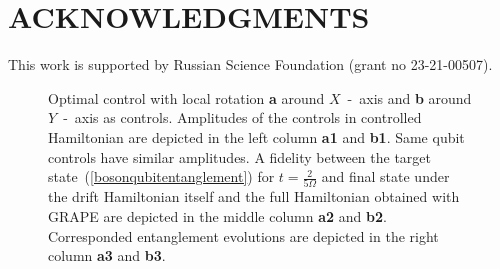 \documentclass[
aps,%
12pt,%
final,%
notitlepage,%
oneside,%
onecolumn,%
nobibnotes,%
nofootinbib,%
superscriptaddress,%
noshowpacs,%
centertags]%
{revtex4}
\begin{document}
\section{ACKNOWLEDGMENTS}
This work is supported by Russian Science Foundation (grant no 23-21-00507).


\newpage

\begin{figure}[t!]
\setcaptionmargin{5mm}
\onelinecaptionsfalse
{}
\caption{
    Optimal control with local rotation {\bf a} around $X$~-~axis and {\bf b} around $Y$~-~axis as controls. Amplitudes of the controls in controlled Hamiltonian are depicted in the left column {\bf a1} and {\bf b1}. Same qubit controls have similar amplitudes. A fidelity between the target state~(\ref{bosonqubitentanglement}) for $t=\frac{2}{5\Omega}$ and final state under the drift Hamiltonian itself and the full Hamiltonian obtained with GRAPE are depicted in the middle column {\bf a2} and {\bf b2}. Corresponded entanglement evolutions are depicted in the right column {\bf a3} and {\bf b3}.
}
\label{fig2:rotation}
\end{figure}

\newpage
\end{document}
